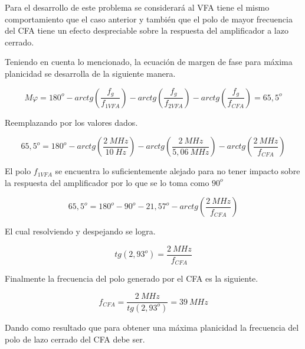 \documentclass[12pt,A4paper,titlepage]{article}
\begin{document}
\bigskip
\hspace{1mm} Para el desarrollo de este problema se considerará al VFA tiene el mismo comportamiento que el caso anterior y también que el polo de mayor frecuencia del CFA tiene un efecto despreciable sobre la respuesta del amplificador a lazo cerrado.

\bigskip
\hspace{1mm} Teniendo en cuenta lo mencionado, la ecuación de margen de fase para máxima planicidad se desarrolla de la siguiente manera.

\begin{equation}
    M \varphi = 180^o - arctg \left(\frac{f_g}{f_{1VFA}}\right) - arctg \left(\frac{f_g}{f_{2VFA}}\right) - arctg \left(\frac{f_g}{f_{CFA}}\right) = 65,5^o
\end{equation}

\bigskip
\hspace{1mm} Reemplazando por los valores dados.

\begin{equation}
    65,5^o = 180^o - arctg \left(\frac{2~MHz}{10~Hz}\right) - arctg \left(\frac{2~MHz}{5,06~MHz}\right) - arctg \left(\frac{2~MHz}{f_{CFA}}\right)
\end{equation}

\bigskip
\hspace{1mm} El polo \( f_{1VFA} \) se encuentra lo suficientemente alejado para no tener impacto sobre la respuesta del amplificador por lo que se lo toma como \( 90^o \)

\begin{equation}
    65,5^o = 180^o - 90^o - 21,57^o - arctg \left(\frac{2~MHz}{f_{CFA}}\right)
\end{equation}

\bigskip
\hspace{1mm} El cual resolviendo y despejando se logra.

\begin{equation}
    tg (2,93^o) = \frac{2~MHz}{f_{CFA}}
\end{equation}

\bigskip
\hspace{1mm} Finalmente la frecuencia del polo generado por el CFA es la siguiente.

\begin{equation}
    f_{CFA} = \frac{2~MHz}{tg (2,93^o)} = 39~MHz
\end{equation}

\bigskip
\hspace{1mm} Dando como resultado que para obtener una máxima planicidad la frecuencia del polo de lazo cerrado del CFA debe ser.
\end{document}
